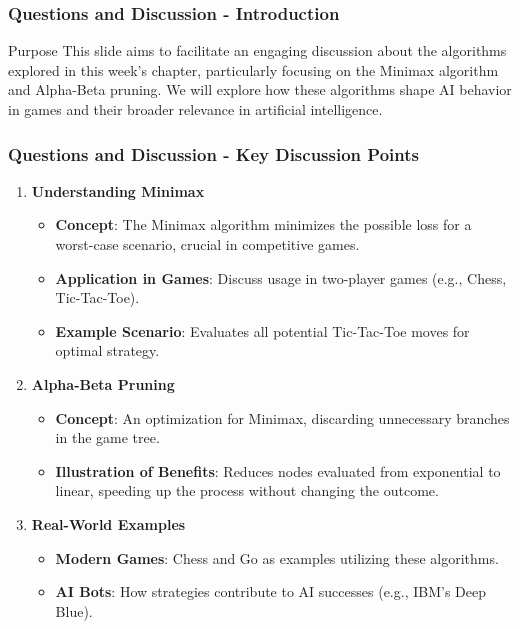 \documentclass[aspectratio=169]{beamer}
\begin{document}
\begin{frame}[fragile]
    \frametitle{Questions and Discussion - Introduction}
    \begin{block}{Purpose}
        This slide aims to facilitate an engaging discussion about the algorithms explored in this week's chapter, particularly focusing on the Minimax algorithm and Alpha-Beta pruning. We will explore how these algorithms shape AI behavior in games and their broader relevance in artificial intelligence.
    \end{block}
\end{frame}

\begin{frame}[fragile]
    \frametitle{Questions and Discussion - Key Discussion Points}
    \begin{enumerate}
        \item \textbf{Understanding Minimax}
            \begin{itemize}
                \item \textbf{Concept}: The Minimax algorithm minimizes the possible loss for a worst-case scenario, crucial in competitive games.
                \item \textbf{Application in Games}: Discuss usage in two-player games (e.g., Chess, Tic-Tac-Toe).
                \item \textbf{Example Scenario}: Evaluates all potential Tic-Tac-Toe moves for optimal strategy.
            \end{itemize}
        \item \textbf{Alpha-Beta Pruning}
            \begin{itemize}
                \item \textbf{Concept}: An optimization for Minimax, discarding unnecessary branches in the game tree.
                \item \textbf{Illustration of Benefits}: Reduces nodes evaluated from exponential to linear, speeding up the process without changing the outcome.
            \end{itemize}
        \item \textbf{Real-World Examples}
            \begin{itemize}
                \item \textbf{Modern Games}: Chess and Go as examples utilizing these algorithms.
                \item \textbf{AI Bots}: How strategies contribute to AI successes (e.g., IBM's Deep Blue).
            \end{itemize}
    \end{enumerate}
\end{frame}
\end{document}
